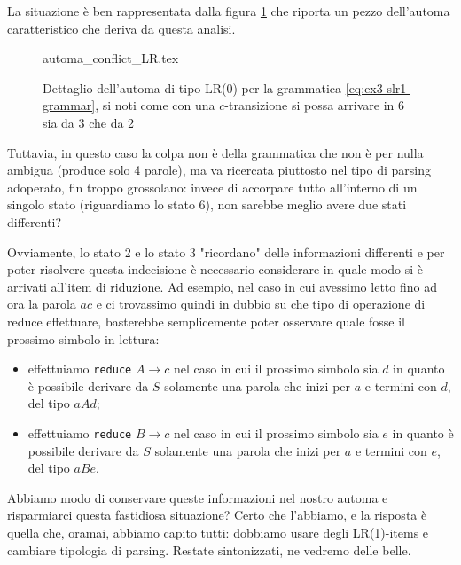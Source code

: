 \documentclass[class=book, crop=false, oneside, 12pt]{standalone}
\begin{document}
La situazione è ben rappresentata dalla figura \ref{fig:lr0-automata_conflict} che riporta un pezzo dell'automa caratteristico che deriva da questa analisi.

\begin{figure}[H]
    \centering
    {automa_conflict_LR.tex}
    \caption{Dettaglio dell'automa di tipo LR(0) per la grammatica \ref{eq:ex3-slr1-grammar}, si noti come con una \(c\)-transizione si possa arrivare in 6 sia da 3 che da 2}
    \label{fig:lr0-automata_conflict}
\end{figure}

Tuttavia, in questo caso la colpa non è della grammatica che non è per nulla ambigua (produce solo 4 parole), ma va ricercata piuttosto nel tipo di parsing adoperato, fin troppo grossolano: invece di accorpare tutto all'interno di un singolo stato (riguardiamo lo stato 6), non sarebbe meglio avere due stati differenti? 

Ovviamente, lo stato 2 e lo stato 3 "ricordano" delle informazioni differenti e per poter risolvere questa indecisione è necessario considerare in quale modo si è arrivati all'item di riduzione. Ad esempio, nel caso in cui avessimo letto fino ad ora la parola \(ac\) e ci trovassimo quindi in dubbio su che tipo di operazione di reduce effettuare, basterebbe semplicemente poter osservare quale fosse il prossimo simbolo in lettura: 
\begin{itemize}
    \item effettuiamo \texttt{reduce} \(A \to c\) nel caso in cui il prossimo simbolo sia \(d\) in quanto è possibile derivare da \(S\) solamente una parola che inizi per \(a\) e termini con \(d\), del tipo \(aAd\);
    \item effettuiamo \texttt{reduce} \(B \to c\) nel caso in cui il prossimo simbolo sia \(e\) in quanto è possibile derivare da \(S\) solamente una parola che inizi per \(a\) e termini con \(e\), del tipo \(aBe\).
\end{itemize}
Abbiamo modo di conservare queste informazioni nel nostro automa e risparmiarci questa fastidiosa situazione? Certo che l'abbiamo, e la risposta è quella che, oramai, abbiamo capito tutti: dobbiamo usare degli LR(1)-items e cambiare tipologia di parsing. Restate sintonizzati, ne vedremo delle belle.
\end{document}
